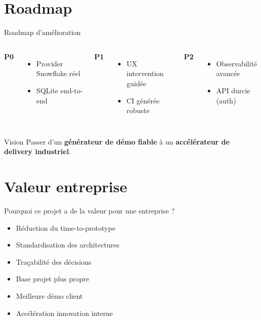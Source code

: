 \documentclass[aspectratio=169,10pt]{beamer}
\begin{document}
\section{Roadmap}
\begin{frame}{Roadmap d'amélioration}
\begin{columns}[T]
\textbf{P0}
\begin{itemize}
  \item Provider Snowflake réel
  \item SQLite end-to-end
\end{itemize}
\textbf{P1}
\begin{itemize}
  \item UX intervention guidée
  \item CI générée robuste
\end{itemize}
\textbf{P2}
\begin{itemize}
  \item Observabilité avancée
  \item API durcie (auth)
\end{itemize}
\end{columns}
\vspace{0.3cm}
\begin{block}{Vision}
Passer d'un \textbf{générateur de démo fiable} à un \textbf{accélérateur de delivery industriel}.
\end{block}
\end{frame}

\section{Valeur entreprise}
\begin{frame}{Pourquoi ce projet a de la valeur pour une entreprise ?}
\begin{itemize}
  \item Réduction du time-to-prototype
  \item Standardisation des architectures
  \item Traçabilité des décisions
  \item Base projet plus propre
  \item Meilleure démo client
  \item Accélération innovation interne
\end{itemize}
\end{frame}

\end{document}
